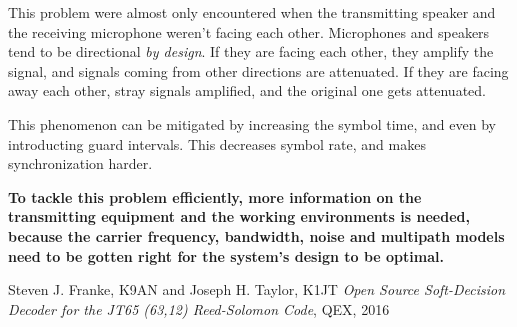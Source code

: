 \documentclass[a4paper]{article}
\begin{document}
This problem were almost only encountered when the transmitting speaker
and the receiving microphone weren't facing each other. Microphones and
speakers tend to be directional \emph{by design}. If they are facing
each other, they amplify the signal, and signals coming from other
directions are attenuated. If they are facing away each other, stray
signals amplified, and the original one gets attenuated.

This phenomenon can be mitigated by increasing the symbol time, and
even by introducting guard intervals. This decreases symbol rate, and
makes synchronization harder.

\textbf{To tackle this problem efficiently, more information on the
transmitting equipment and the working environments is needed, because
the carrier frequency, bandwidth, noise and multipath models need to be
gotten right for the system's design to be optimal.}

\begin{thebibliography}{9}
  Steven J. Franke, K9AN and Joseph H. Taylor, K1JT
  \emph{Open Source Soft-Decision Decoder for the JT65 (63,12) Reed-Solomon
  Code}, QEX, 2016
\end{thebibliography}
\end{document}
